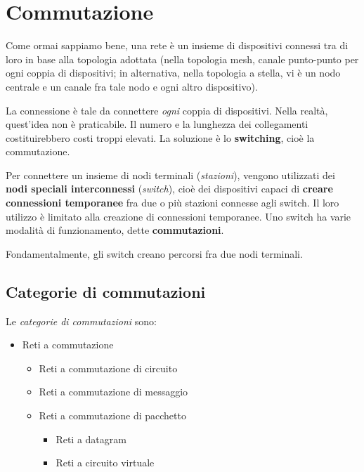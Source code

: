 \section{Commutazione}
    Come ormai sappiamo bene, una rete è un insieme di dispositivi connessi tra di loro in base alla topologia adottata (nella topologia mesh, canale punto-punto per ogni coppia di dispositivi; in alternativa, nella topologia a stella, vi è un nodo centrale e un canale fra tale nodo e ogni altro dispositivo). 
    
    La connessione è tale da connettere \textit{ogni} coppia di dispositivi. Nella realtà, quest'idea non è praticabile. Il numero e la lunghezza dei collegamenti costituirebbero costi troppi elevati. La soluzione è lo \textbf{switching}, cioè la commutazione.
    
    \vspace{3mm}
    
    Per connettere un insieme di nodi terminali (\textit{stazioni}), vengono utilizzati dei \textbf{nodi speciali interconnessi} (\textit{switch}), cioè dei dispositivi capaci di \textbf{creare connessioni temporanee} fra due o più stazioni connesse agli switch. Il loro utilizzo è limitato alla creazione di connessioni temporanee. Uno switch ha varie modalità di funzionamento, dette \textbf{commutazioni}. 
    
    Fondamentalmente, gli switch creano percorsi fra due nodi terminali.
    
    \subsection{Categorie di commutazioni}
    
        Le \textit{categorie di commutazioni} sono:
        
        \begin{itemize}
            \item 
                Reti a commutazione
            
            \begin{itemize}
                \item 
                    Reti a commutazione di circuito
                    
                \item 
                    Reti a commutazione di messaggio
    
                \item 
                    Reti a commutazione di pacchetto
                
                    \begin{itemize}
                        \item 
                            Reti a datagram
                            
                        \item 
                            Reti a circuito virtuale
                    \end{itemize}
            \end{itemize}
        \end{itemize}
    

